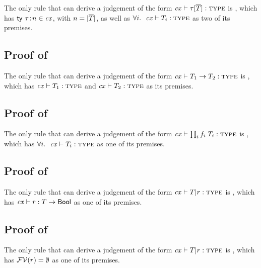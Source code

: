 The only rule that can derive a judgement of the form $\mathit{cx}\vdash\tau[\overline{T}]:\textsc{type}$ is
\Rtinst, which has $\mathsf{ty}\ \tau\!:\!n\in\mathit{cx}$, with $n=|\overline{T}|$, as well as
$\forall i.\ \ \mathit{cx}\vdash T_i:\textsc{type}$ as two of its premises.



\subsection*{Proof of }

The only rule that can derive a judgement of the form $\mathit{cx}\vdash T_1\to T_2:\textsc{type}$ is
\Rtarr, which has $\mathit{cx}\vdash T_1:\textsc{type}$ and $\mathit{cx}\vdash T_2:\textsc{type}$ as its premises.



\subsection*{Proof of }

The only rule that can derive a judgement of the form $\mathit{cx}\vdash\prod_{i}f_i\;T_i:\textsc{type}$ is
\Rtrec, which has $\forall i.\ \ \mathit{cx}\vdash T_i:\textsc{type}$ as one of its premises.







\subsection*{Proof of }

The only rule that can derive a judgement of the form $\mathit{cx}\vdash T|r:\textsc{type}$ is
\Rtsub, which has $\mathit{cx}\vdash r:T\to\mathsf{Bool}$ as one of its
premises.



\subsection*{Proof of }

The only rule that can derive a judgement of the form $\mathit{cx}\vdash T|r:\textsc{type}$ is
\Rtsub, which has $\mathcal{FV}(r)=\emptyset$ as one of its premises.



